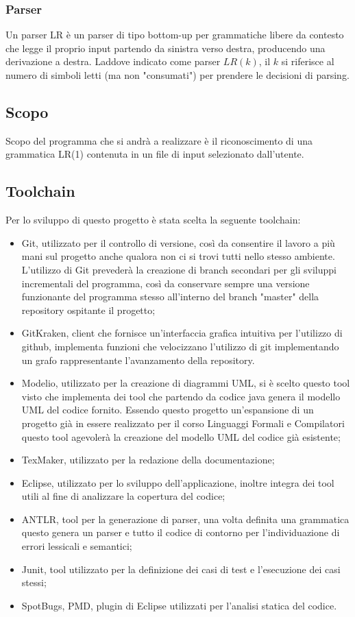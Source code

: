 \documentclass[12pt]{article}
\begin{document}
\subsubsection*{Parser}
Un parser LR è un parser di tipo bottom-up per grammatiche libere da contesto che legge il proprio input partendo da sinistra verso destra, producendo una derivazione a destra. Laddove indicato come parser $LR \left( k \right)$, il $k$ si riferisce al numero di simboli letti (ma non "consumati") per prendere le decisioni di parsing.

\subsection{Scopo}
Scopo del programma che si andrà a realizzare è il riconoscimento di una grammatica LR(1) contenuta in un file di input selezionato dall'utente. \par

\pagebreak

\subsection{Toolchain}
Per lo sviluppo di questo progetto è stata scelta la seguente toolchain:
\begin{itemize}
\item Git, utilizzato per il controllo di versione, così da consentire il lavoro a più mani sul progetto anche qualora non ci si trovi tutti nello stesso ambiente. L'utilizzo di Git prevederà la creazione di branch secondari per gli sviluppi incrementali del programma, così da conservare sempre una versione funzionante del programma stesso all'interno del branch "master" della repository ospitante il progetto;
\item GitKraken, client che fornisce un'interfaccia grafica intuitiva per l'utilizzo di github, implementa funzioni che velocizzano l'utilizzo di git implementando un grafo rappresentante l'avanzamento della repository.
\item Modelio, utilizzato per la creazione di diagrammi UML, si è scelto questo tool visto che implementa dei tool che partendo da codice java genera il modello UML del codice fornito. Essendo questo progetto un'espansione di un progetto già in essere realizzato per il corso Linguaggi Formali e Compilatori questo tool agevolerà la creazione del modello UML del codice già esistente;
\item TexMaker, utilizzato per la redazione della documentazione;
\item Eclipse, utilizzato per lo sviluppo dell'applicazione, inoltre integra dei tool utili al fine di analizzare la copertura del codice;
\item ANTLR, tool per la generazione di parser, una volta definita una grammatica questo genera un parser e tutto il codice di contorno per l'individuazione di errori lessicali e semantici;
\item Junit, tool utilizzato per la definizione dei casi di test e l'esecuzione dei casi stessi;
\item SpotBugs, PMD, plugin di Eclipse utilizzati per l'analisi statica del codice.
\end{itemize}
\end{document}
